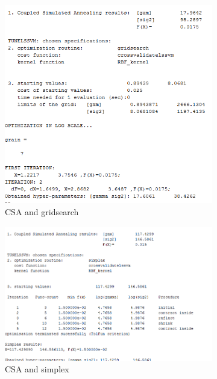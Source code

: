 \documentclass[11pt,oneside,a4paper]{article}
\begin{document}
\begin{figure}[H]
	\begin{subfigure}[b]{0.4\textwidth}
		\includegraphics[width=\textwidth]{../Figures/diabetes_CSA_grid}
		\caption{CSA and gridsearch}
	\end{subfigure}
	\begin{subfigure}[b]{0.4\textwidth}
		\includegraphics[width=\textwidth]{../Figures/diabetes_CSA_simp}
		\caption{CSA and simplex}
	\end{subfigure}
	\begin{subfigure}[b]{0.4\textwidth}

\end{subfigure}
\end{figure}
\end{document}
